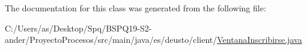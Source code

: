 The documentation for this class was generated from the following file\+:\begin{DoxyCompactItemize}
\item 
C\+:/\+Users/as/\+Desktop/\+Spq/\+B\+S\+P\+Q19-\/\+S2-\/ander/\+Proyecto\+Procesos/src/main/java/es/deusto/client/\mbox{\hyperlink{_ventana_inscribirse_8java}{Ventana\+Inscribirse.\+java}}\end{DoxyCompactItemize}
